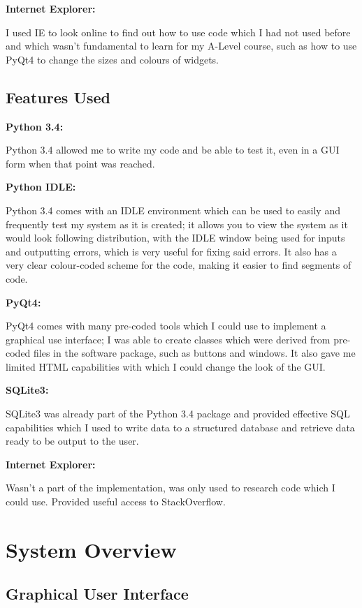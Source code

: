 \textbf{Internet Explorer: }

I used IE to look online to find out how to use code which I had not used before and which wasn't fundamental to learn for my A-Level course, such as how to use PyQt4 to change the sizes and colours of widgets.

\subsection{Features Used}

\textbf{Python 3.4: }

Python 3.4 allowed me to write my code and be able to test it, even in a GUI form when that point was reached. 

\textbf{Python IDLE: }

Python 3.4 comes with an IDLE environment which can be used to easily and frequently test my system as it is created; it allows you to view the system as it would look following distribution, with the IDLE window being used for inputs and outputting errors, which is very useful for fixing said errors. It also has a very clear colour-coded scheme for the code, making it easier to find segments of code.

\textbf{PyQt4: }

PyQt4 comes with many pre-coded tools which I could use to implement a graphical use interface; I was able to create classes which were derived from pre-coded files in the software package, such as buttons and windows. It also gave me limited HTML capabilities with which I could change the look of the GUI.

\textbf{SQLite3: }

SQLite3 was already part of the Python 3.4 package and provided effective SQL capabilities which I used to write data to a structured database and retrieve data ready to be output to the user.

\textbf{Internet Explorer: }

Wasn't a part of the implementation, was only used to research code which I could use. Provided useful access to StackOverflow.

\section{System Overview}

\subsection{Graphical User Interface}

